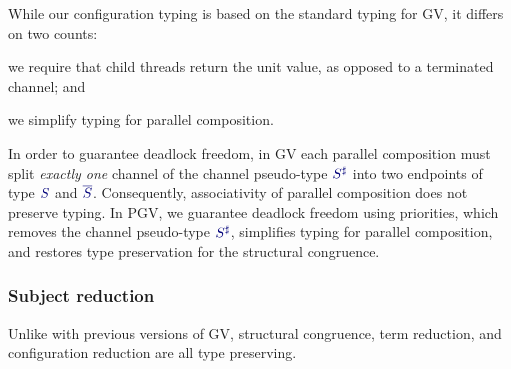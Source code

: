 \documentclass[main.tex]{subfiles}
\begin{document}
While our configuration typing is based on the standard typing for GV, it differs on two counts:
\begin{enumerate*}[label=(\roman*)]
\item we require that child threads return the unit value, as opposed to a terminated channel; and
\item we simplify typing for parallel composition.
\end{enumerate*}
In order to guarantee deadlock freedom, in GV each parallel composition must split \emph{exactly one} channel of the channel pseudo-type $\ty{S^\sharp}$ into two endpoints of type $\ty{S}$ and $\ty{\co{S}}$. Consequently, associativity of parallel composition does not preserve typing. In PGV, we guarantee deadlock freedom using priorities, which removes the channel pseudo-type $\ty{S^\sharp}$, simplifies typing for parallel composition, and restores type preservation for the structural congruence.


\subsubsection*{Subject reduction}
Unlike with previous versions of GV, structural congruence, term reduction, and configuration reduction are all type preserving.
\end{document}
